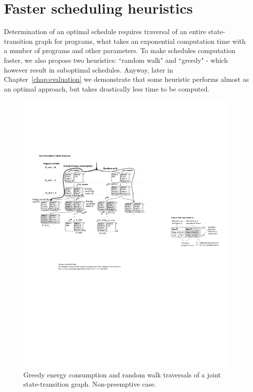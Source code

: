 \chapter{Faster scheduling heuristics}
\label{chap:schedulingHeuristics}

Determination of an optimal schedule requires traversal of an entire state-transition graph for programs, what takes an exponential computation time with a number of programs and other parameters. To make schedules computation faster, we also propose two heuristics: ``random walk" and ``greedy" \-- which however result in suboptimal schedules. Anyway, later in Chapter~\ref{chap:evaluation} we demonstrate that some heuristic performs almost as an optimal approach, but takes drastically less time to be computed. 

\begin{figure}
\center
\includegraphics[width=.9\textwidth]{figs/greedyAndRandomWalk.pdf}
\caption{Greedy energy consumption and random walk traversals of a joint state-transition graph. Non-preemptive case.}
\label{fig:greedyAndRandomWalk}
\end{figure}

